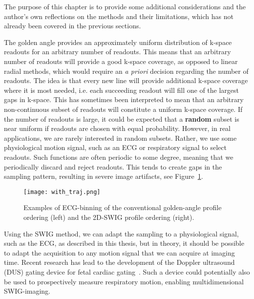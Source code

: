 
 The purpose of this chapter is to provide some additional considerations and the author's own reflections on the methods and their limitations, which has not already been covered in the previous sections.

The golden angle provides an approximately uniform distribution of k-space readouts for an arbitrary number of readouts. This means that an arbitrary number of readouts will provide a good k-space coverage, as opposed to linear radial methods, which would require an \emph{a priori} decision regarding the number of readouts. The idea is that every new line will provide additional k-space coverage where it is most needed, i.e. each succeeding readout will fill one of the largest gaps in k-space. This has sometimes been interpreted to mean that an arbitrary non-continuous subset of readouts will constitute a uniform k-space coverage. If the number of readouts is large, it could be expected that a \textbf{random} subset is near uniform if readouts are chosen with equal probability. However, in real applications, we are rarely interested in random subsets. Rather, we use some physiological motion signal, such as an ECG or respiratory signal to select readouts. Such functions are often periodic to some degree, meaning that we periodically discard and reject readouts. This tends to create gaps in the sampling pattern, resulting in severe image artifacts, see Figure~\ref{fig:swig_binning}.
\begin{figure}[htbp]
    \centering
    \texttt{[image: with\_traj.png]}
    \caption{Examples of ECG-binning of the conventional golden-angle profile ordering (left) and the 2D-SWIG profile ordering (right).}
    \label{fig:swig_binning}
\end{figure}
Using the SWIG method, we can adapt the sampling to a physiological signal, such as the ECG, as described in this thesis, but in theory, it should be possible to adapt the acquisition to any motion signal that we can acquire at imaging time. Recent research has lead to the development of the Doppler ultrasound (DUS)  gating device for fetal cardiac gating~\cite{Kording2018}. Such a device could potentially also be used to prospectively measure respiratory motion, enabling multidimensional SWIG-imaging.

